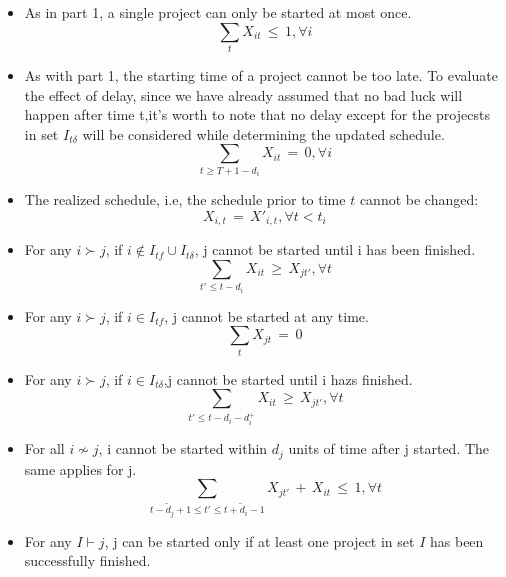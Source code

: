 \documentclass[final,3p,times]{elsarticle}
\begin{document}
\begin{itemize}\label{StartCon1}
	\item As in part 1, a single project can only be started at most once.
	\begin{equation}
		\sum\limits_{t} X_{it}\,\leq\,1,\forall i
	\end{equation}
	\item As with part 1, the starting time of a project cannot be too late. To evaluate the effect of delay, since we have already assumed that no bad luck will happen after time t,it's worth to note that no delay except for the projecsts in set $I_{t\delta}$ will be considered while determining the updated schedule.
	\begin{equation}
		\label{EqnStartOnlyOnce2}
		\sum\limits_{t\geq T+1-d_i} X_{it}\,=\,0, \forall i
	\end{equation}
	\item The realized schedule, i.e, the schedule prior to time $t$ cannot be changed:
	\begin{equation}
		X_{i,t}\,=\,X'_{i,t}, \forall t < t_i
	\end{equation}
	\item For any $i\succ j$, if $i\notin I_{tf}\cup I_{t\delta}$, j cannot be started until i has been finished.                 
	\begin{equation}
		\sum\limits_{t'\leq t-d_i} X_{it} \,\geq\, X_{jt'},\forall t 
	\end{equation} 
	\item For any $i\succ j$, if $i\in I_{tf}$, j cannot be started at any time.
	\begin{equation}
		\sum\limits_{t} X_{jt}\,=\,0
	\end{equation}
	\item For any $i\succ j$, if $i\in I_{t\delta}$,j cannot be started until i hazs finished.
	\begin{equation}
		\sum\limits_{t'\leq t-d_i-d^+_i} X_{it} \,\geq\, X_{jt'},\forall  t 
	\end{equation}
	\item For all $i \nsim j$, i cannot be started within $d_j$ units of time after j started. The same applies for j.
	\begin{equation}
		\sum\limits_{t-\tilde{d}_j+1\leq t'\leq t+\tilde{d}_i-1} X_{jt'}\,+\,X_{it}\,\leq\,1, \forall t 
	\end{equation}
	\item For any $I \vdash j$, j can be started only if at least one project in set $I$ has been successfully finished. 

\end{itemize}
\end{document}
